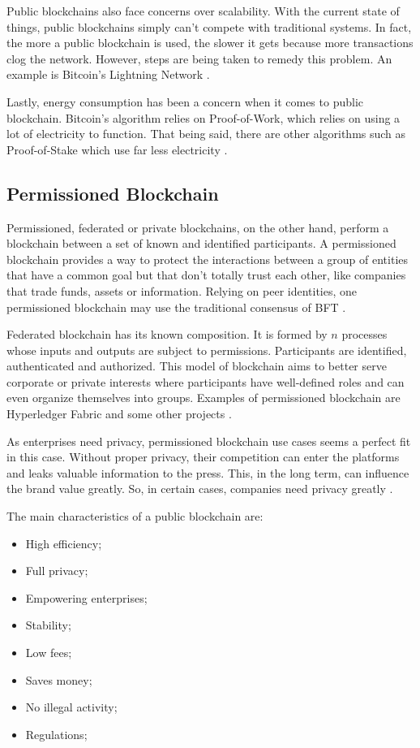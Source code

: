 Public blockchains also face concerns over scalability. With the current state of things, public blockchains simply can’t compete with traditional systems. In fact, the more a public blockchain is used, the slower it gets because more transactions clog the network. However, steps are being taken to remedy this problem. An example is Bitcoin’s Lightning Network \cite{selfkeyOrg}.

Lastly, energy consumption has been a concern when it comes to public blockchain. Bitcoin’s algorithm relies on Proof-of-Work, which relies on using a lot of electricity to function. That being said, there are other algorithms such as Proof-of-Stake which use far less electricity \cite{selfkeyOrg}. 


\subsection{Permissioned Blockchain}\label{sec:blockchainPrivada}
Permissioned, federated or private blockchains, on the other hand, perform a blockchain between a set of known and identified participants. A permissioned blockchain provides a way to protect the interactions between a group of entities that have a common goal but that don't totally trust each other, like companies that trade funds, assets or information. Relying on peer identities, one permissioned blockchain may use the traditional consensus of \acf{BFT} \cite{androulaki2018hyperledger}.

Federated blockchain has its known composition. It is formed by $n$ processes whose inputs and outputs are subject to permissions. Participants are identified, authenticated and authorized. This model of blockchain aims to better serve corporate or private interests where participants have well-defined roles and can even organize themselves into groups. Examples of permissioned blockchain are Hyperledger Fabric \cite{cachin2016architecture} and some other projects \cite{cachin2017blockchain}.

As enterprises need privacy, permissioned blockchain use cases seems a perfect fit in this case. Without proper privacy, their competition can enter the platforms and leaks valuable information to the press. This, in the long term, can influence the brand value greatly. So, in certain cases, companies need privacy greatly \cite{101blockchains}.

The main characteristics of a public blockchain are:

\begin{itemize}
\item High efficiency;
\item Full privacy;
\item Empowering enterprises;
\item Stability;
\item Low fees;
\item Saves money;
\item No illegal activity;
\item Regulations;
\end{itemize}

